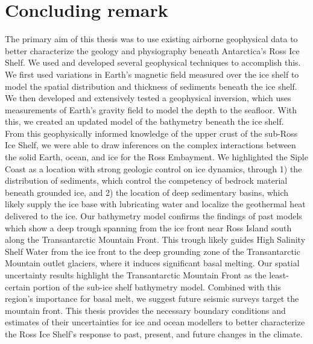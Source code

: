 \section{Concluding remark}

The primary aim of this thesis was to use existing airborne geophysical data to better characterize the geology and physiography beneath Antarctica's Ross Ice Shelf. We used and developed several geophysical techniques to accomplish this. We first used variations in Earth's magnetic field measured over the ice shelf to model the spatial distribution and thickness of sediments beneath the ice shelf. We then developed and extensively tested a geophysical inversion, which uses measurements of Earth's gravity field to model the depth to the seafloor. With this, we created an updated model of the bathymetry beneath the ice shelf. \\

From this geophysically informed knowledge of the upper crust of the sub-Ross Ice Shelf, we were able to draw inferences on the complex interactions between the solid Earth, ocean, and ice for the Ross Embayment. We highlighted the Siple Coast as a location with strong geologic control on ice dynamics, through 1) the distribution of sediments, which control the competency of bedrock material beneath grounded ice, and 2) the location of deep sedimentary basins, which likely supply the ice base with lubricating water and localize the geothermal heat delivered to the ice. Our bathymetry model confirms the findings of past models which show a deep trough spanning from the ice front near Ross Island south along the Transantarctic Mountain Front. This trough likely guides High Salinity Shelf Water from the ice front to the deep grounding zone of the Transantarctic Mountain outlet glaciers, where it induces significant basal melting. Our spatial uncertainty results highlight the Transantarctic Mountain Front as the least-certain portion of the sub-ice shelf bathymetry model. Combined with this region's importance for basal melt, we suggest future seismic surveys target the mountain front. This thesis provides the necessary boundary conditions and estimates of their uncertainties for ice and ocean modellers to better characterize the Ross Ice Shelf's response to past, present, and future changes in the climate. 